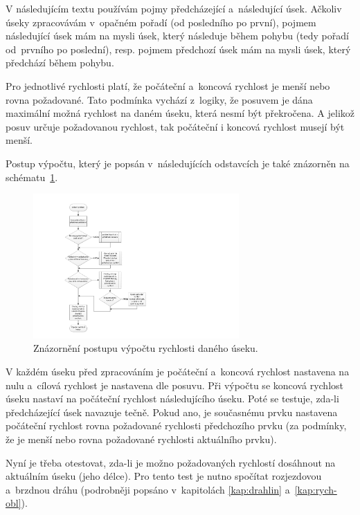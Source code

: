 	V následujícím textu používám pojmy předcházející a~následující úsek. Ačkoliv úseky zpracovávám v~opačném pořadí (od posledního po první), pojmem následující úsek mám na mysli úsek, který následuje během pohybu (tedy pořadí od~prvního po poslední), resp. pojmem předchozí úsek mám na mysli úsek, který předchází během pohybu.
	
	Pro jednotlivé rychlosti platí, že počáteční a~koncová rychlost je menší nebo rovna požadované. Tato podmínka vychází z~logiky, že posuvem je dána maximální možná rychlost na daném úseku, která nesmí být překročena. A jelikož posuv určuje požadovanou rychlost, tak počáteční i koncová rychlost musejí být menší.
	
	Postup výpočtu, který je popsán v~následujících odstavcích je také znázorněn na schématu~\ref{nak:vypocet}.
	
	\begin{figure}[h!]
		\centering
		\includegraphics[width=0.7\textwidth]{img/vypocetrychlosti.pdf}
		\caption{Znázornění postupu výpočtu rychlosti daného úseku.}\label{nak:vypocet}	
	\end{figure}
	
	V každém úseku před zpracováním je počáteční a~koncová rychlost nastavena na nulu a~cílová rychlost je nastavena dle posuvu. Při výpočtu se koncová rychlost úseku nastaví na počáteční rychlost následujícího úseku. Poté se testuje, zda-li předcházející úsek navazuje tečně. Pokud ano, je současnému prvku nastavena počáteční rychlost rovna požadované rychlosti předchozího prvku (za podmínky, že je menší nebo rovna požadované rychlosti aktuálního prvku).
	
	Nyní je třeba otestovat, zda-li je možno požadovaných rychlostí dosáhnout na aktuálním úseku (jeho délce). Pro tento test je nutno spočítat rozjezdovou a~brzdnou dráhu (podrobněji popsáno v~kapitolách \ref{kap:drahlin} a~\ref{kap:rych-obl}).
	
